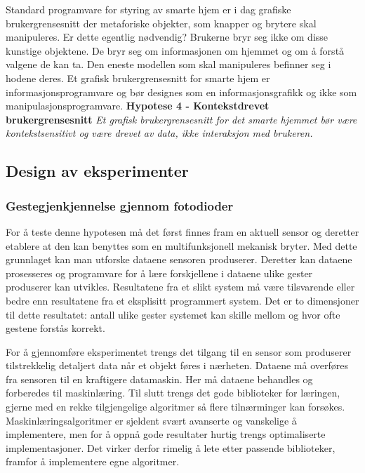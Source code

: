 Standard programvare for styring av smarte hjem er i dag grafiske brukergrensesnitt der metaforiske objekter, som knapper og brytere skal manipuleres. Er dette egentlig nødvendig? Brukerne bryr seg ikke om disse kunstige objektene. De bryr seg om informasjonen om hjemmet og om å forstå valgene de kan ta. Den eneste modellen som skal manipuleres befinner seg i hodene deres. Et grafisk brukergrensesnitt for smarte hjem er informasjonsprogramvare og bør designes som en informasjonsgrafikk og ikke som manipulasjonsprogramvare.\newline\newline
\textbf{Hypotese 4 - Kontekstdrevet brukergrensesnitt}\newline
\emph{Et grafisk brukergrensesnitt for det smarte hjemmet bør være kontekstsensitivt og være drevet av data, ikke interaksjon med brukeren.}\newline

\subsection{Design av eksperimenter}

\subsubsection*{Gestegjenkjennelse gjennom fotodioder}
For å teste denne hypotesen må det først finnes fram en aktuell sensor og deretter etablere at den kan benyttes som en multifunksjonell mekanisk bryter. Med dette grunnlaget kan man utforske dataene sensoren produserer. Deretter kan dataene prosesseres og programvare for å lære forskjellene i dataene ulike gester produserer kan utvikles. Resultatene fra et slikt system må være tilsvarende eller bedre enn resultatene fra et eksplisitt programmert system. Det er to dimensjoner til dette resultatet: antall ulike gester systemet kan skille mellom og hvor ofte gestene forstås korrekt.

For å gjennomføre eksperimentet trengs det tilgang til en sensor som produserer tilstrekkelig detaljert data når et objekt føres i nærheten. Dataene må overføres fra sensoren til en kraftigere datamaskin. Her må dataene behandles og forberedes til maskinlæring. Til slutt trengs det gode biblioteker for læringen, gjerne med en rekke tilgjengelige algoritmer så flere tilnærminger kan forsøkes. Maskinlæringsalgoritmer er sjeldent svært avanserte og vanskelige å implementere, men for å oppnå gode resultater hurtig trengs optimaliserte implementasjoner. Det virker derfor rimelig å lete etter passende biblioteker, framfor å implementere egne algoritmer.

